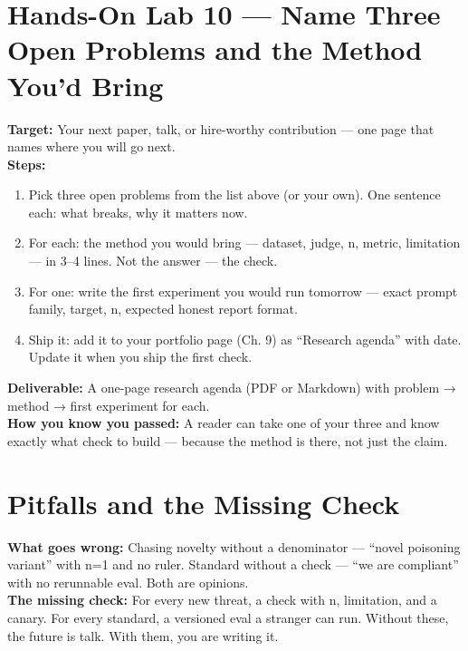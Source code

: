 \section{Hands-On Lab 10 — Name Three Open Problems and the Method You'd Bring}
\begin{labbox}
\textbf{Target:} Your next paper, talk, or hire-worthy contribution — one page that names where you will go next.\\[4pt]
\textbf{Steps:}
\begin{enumerate}
\item Pick three open problems from the list above (or your own). One sentence each: what breaks, why it matters now.
\item For each: the method you would bring — dataset, judge, n, metric, limitation — in 3–4 lines. Not the answer — the check.
\item For one: write the first experiment you would run tomorrow — exact prompt family, target, n, expected honest report format.
\item Ship it: add it to your portfolio page (Ch. 9) as ``Research agenda'' with date. Update it when you ship the first check.
\end{enumerate}
\textbf{Deliverable:} A one-page research agenda (PDF or Markdown) with problem → method → first experiment for each.\\[2pt]
\textbf{How you know you passed:} A reader can take one of your three and know exactly what check to build — because the method is there, not just the claim.
\end{labbox}

\section{Pitfalls and the Missing Check}
\begin{pitfallbox}
\textbf{What goes wrong:} Chasing novelty without a denominator — ``novel poisoning variant'' with n=1 and no ruler. Standard without a check — ``we are compliant'' with no rerunnable eval. Both are opinions.\\[4pt]
\textbf{The missing check:} For every new threat, a check with n, limitation, and a canary. For every standard, a versioned eval a stranger can run. Without these, the future is talk. With them, you are writing it.
\end{pitfallbox}

